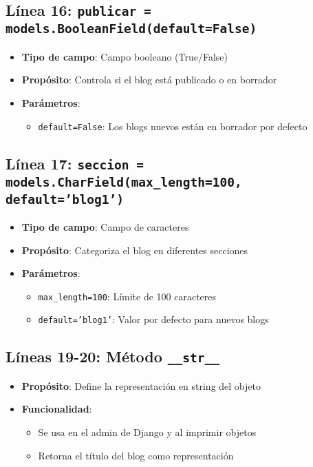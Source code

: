 \documentclass[12pt,a4paper]{article}
\begin{document}
	\subsection{Línea 16: \texttt{publicar = models.BooleanField(default=False)}}
	\begin{itemize}
		\item \textbf{Tipo de campo}: Campo booleano (True/False)
		\item \textbf{Propósito}: Controla si el blog está publicado o en borrador
		\item \textbf{Parámetros}:
		\begin{itemize}
			\item \texttt{default=False}: Los blogs nuevos están en borrador por defecto
		\end{itemize}
	\end{itemize}
	
	\subsection{Línea 17: \texttt{seccion = models.CharField(max\_length=100, default='blog1')}}
	\begin{itemize}
		\item \textbf{Tipo de campo}: Campo de caracteres
		\item \textbf{Propósito}: Categoriza el blog en diferentes secciones
		\item \textbf{Parámetros}:
		\begin{itemize}
			\item \texttt{max\_length=100}: Límite de 100 caracteres
			\item \texttt{default='blog1'}: Valor por defecto para nuevos blogs
		\end{itemize}
	\end{itemize}
	
	\subsection{Líneas 19-20: Método \texttt{\_\_str\_\_}}
	\begin{itemize}
		\item \textbf{Propósito}: Define la representación en string del objeto
		\item \textbf{Funcionalidad}:
		\begin{itemize}
			\item Se usa en el admin de Django y al imprimir objetos
			\item Retorna el título del blog como representación
		\end{itemize}
	\end{itemize}
	
\end{document}
